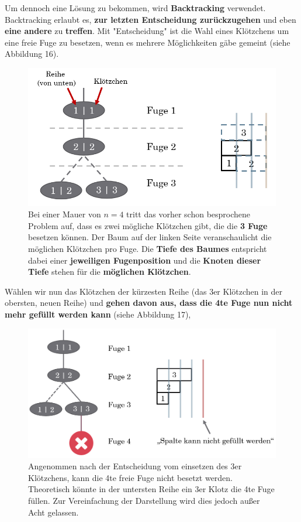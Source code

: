 \documentclass[a4paper,12pt]{article}
\begin{document}
Um dennoch eine Lösung zu bekommen, wird \textbf{Backtracking} verwendet. Backtracking erlaubt es, \textbf{zur letzten Entscheidung zurückzugehen} und eben \textbf{eine andere} zu \textbf{treffen}. Mit "Entscheidung" ist die Wahl eines Klötzchens um eine freie Fuge zu besetzen, wenn es mehrere Möglichkeiten gäbe gemeint (siehe Abbildung 16).
\begin{figure}[H]
    \centering
    \includegraphics[width=1\linewidth]{Bilder/Aufgabe1/Backtracking_01.png}
    \caption{Bei einer Mauer von $n = 4$ tritt das vorher schon besprochene Problem auf, dass es zwei mögliche Klötzchen gibt, die die \textbf{3 Fuge} besetzen können. Der Baum auf der linken Seite veranschaulicht die möglichen Klötzchen pro Fuge. Die \textbf{Tiefe des Baumes} entspricht dabei einer \textbf{jeweiligen Fugenposition} und die \textbf{Knoten dieser Tiefe} stehen für die \textbf{möglichen Klötzchen}.}
\end{figure}
Wählen wir nun das Klötzchen der kürzesten Reihe (das 3er Klötzchen in der obersten, neuen Reihe) und \textbf{gehen davon aus, dass die 4te Fuge nun nicht mehr gefüllt werden kann} (siehe Abbildung 17),
\begin{figure}[H]
    \centering
    \includegraphics[width=1\linewidth]{Bilder/Aufgabe1/Backtracking_02.png}
    \caption{Angenommen nach der Entscheidung vom einsetzen des 3er Klötzchens, kann die 4te freie Fuge nicht besetzt werden. Theoretisch könnte in der untersten Reihe ein 3er Klotz die 4te Fuge füllen. Zur Vereinfachung der Darstellung wird dies jedoch außer Acht gelassen.}
\end{figure}
\end{document}
